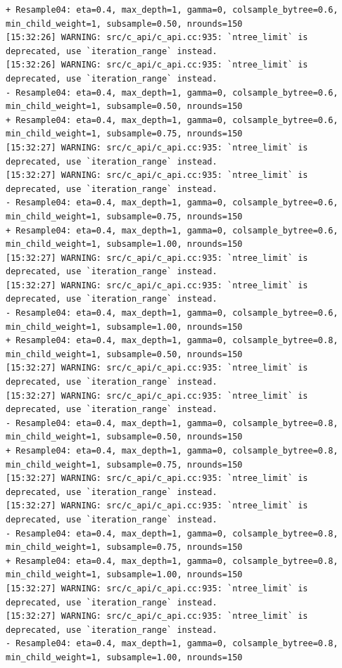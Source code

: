 \documentclass[
  letterpaper,
  DIV=11,
  numbers=noendperiod]{scrartcl}
\begin{document}
\begin{verbatim}
+ Resample04: eta=0.4, max_depth=1, gamma=0, colsample_bytree=0.6, min_child_weight=1, subsample=0.50, nrounds=150 
[15:32:26] WARNING: src/c_api/c_api.cc:935: `ntree_limit` is deprecated, use `iteration_range` instead.
[15:32:26] WARNING: src/c_api/c_api.cc:935: `ntree_limit` is deprecated, use `iteration_range` instead.
- Resample04: eta=0.4, max_depth=1, gamma=0, colsample_bytree=0.6, min_child_weight=1, subsample=0.50, nrounds=150 
+ Resample04: eta=0.4, max_depth=1, gamma=0, colsample_bytree=0.6, min_child_weight=1, subsample=0.75, nrounds=150 
[15:32:27] WARNING: src/c_api/c_api.cc:935: `ntree_limit` is deprecated, use `iteration_range` instead.
[15:32:27] WARNING: src/c_api/c_api.cc:935: `ntree_limit` is deprecated, use `iteration_range` instead.
- Resample04: eta=0.4, max_depth=1, gamma=0, colsample_bytree=0.6, min_child_weight=1, subsample=0.75, nrounds=150 
+ Resample04: eta=0.4, max_depth=1, gamma=0, colsample_bytree=0.6, min_child_weight=1, subsample=1.00, nrounds=150 
[15:32:27] WARNING: src/c_api/c_api.cc:935: `ntree_limit` is deprecated, use `iteration_range` instead.
[15:32:27] WARNING: src/c_api/c_api.cc:935: `ntree_limit` is deprecated, use `iteration_range` instead.
- Resample04: eta=0.4, max_depth=1, gamma=0, colsample_bytree=0.6, min_child_weight=1, subsample=1.00, nrounds=150 
+ Resample04: eta=0.4, max_depth=1, gamma=0, colsample_bytree=0.8, min_child_weight=1, subsample=0.50, nrounds=150 
[15:32:27] WARNING: src/c_api/c_api.cc:935: `ntree_limit` is deprecated, use `iteration_range` instead.
[15:32:27] WARNING: src/c_api/c_api.cc:935: `ntree_limit` is deprecated, use `iteration_range` instead.
- Resample04: eta=0.4, max_depth=1, gamma=0, colsample_bytree=0.8, min_child_weight=1, subsample=0.50, nrounds=150 
+ Resample04: eta=0.4, max_depth=1, gamma=0, colsample_bytree=0.8, min_child_weight=1, subsample=0.75, nrounds=150 
[15:32:27] WARNING: src/c_api/c_api.cc:935: `ntree_limit` is deprecated, use `iteration_range` instead.
[15:32:27] WARNING: src/c_api/c_api.cc:935: `ntree_limit` is deprecated, use `iteration_range` instead.
- Resample04: eta=0.4, max_depth=1, gamma=0, colsample_bytree=0.8, min_child_weight=1, subsample=0.75, nrounds=150 
+ Resample04: eta=0.4, max_depth=1, gamma=0, colsample_bytree=0.8, min_child_weight=1, subsample=1.00, nrounds=150 
[15:32:27] WARNING: src/c_api/c_api.cc:935: `ntree_limit` is deprecated, use `iteration_range` instead.
[15:32:27] WARNING: src/c_api/c_api.cc:935: `ntree_limit` is deprecated, use `iteration_range` instead.
- Resample04: eta=0.4, max_depth=1, gamma=0, colsample_bytree=0.8, min_child_weight=1, subsample=1.00, nrounds=150 

\end{verbatim}
\end{document}
